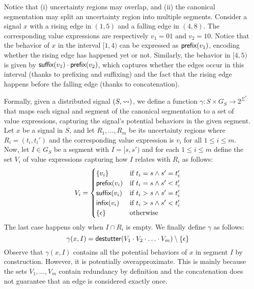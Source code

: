 Notice that (i) uncertainty regions may overlap, and (ii) the canonical segmentation may split an uncertainty region into multiple segments.
Consider a signal $x$ with a rising edge in $(1,5)$ and a falling edge in $(4,8)$.
The corresponding value expressions are respectively $v_1 = 01$ and $v_2 = 10$.
Notice that the behavior of $x$ in the interval $[1,4)$ can be expressed as $\textsf{prefix}(v_1)$, encoding whether the rising edge has happened yet or not.
Similarly, the behavior in $[4,5)$ is given by $\textsf{suffix}(v_1) \cdot \textsf{prefix}(v_2)$, which captures whether the edges occur in this interval (thanks to prefixing and suffixing) and the fact that the rising edge happens before the falling edge (thanks to concatenation).



Formally, given a distributed signal $(S,{\rightsquigarrow})$, we define a function $\gamma : S \times G_S \to 2^{\Sigma^*}$ that maps each signal and segment of the canonical segmentation to a set of value expressions, capturing the signal's potential behaviors in the given segment.
Let $x$ be a signal in $S$, and let $R_1, \ldots, R_m$ be its uncertainty regions where $R_i = (t_i, t_i')$ and the corresponding value expression is $v_i$ for all $1 \leq i \leq m$.
Now, let $I \in G_S$ be a segment with $I = [s, s')$ and for each $1 \leq i \leq m$ define the set $V_i$ of value expressions capturing how $I$ relates with $R_i$ as follows:
%
\small
\begin{equation} \label{eq:valexprset}
	V_i = 
	\begin{cases}
		\{v_i\} & \text{if } t_i = s \land s' = t_i' \\
		\textsf{prefix}(v_i) & \text{if } t_i = s \land s' < t_i' \\
		\textsf{suffix}(v_i) & \text{if } t_i > s \land s' = t_i' \\
		\textsf{infix}(v_i) & \text{if } t_i > s \land s' < t_i' \\
		\{\epsilon\} & \text{otherwise}
	\end{cases}
\end{equation}
\normalsize
The last case happens only when $I \cap R_i$ is 
empty.
We finally define $\gamma$ as follows:
\[ \gamma(x,I) = \mathsf{destutter}(V_1 \cdot V_2 \cdot \ldots \cdot V_m) \setminus \{\epsilon\} \]
Observe that $\gamma(x,I)$ contains all the potential behaviors of $x$ in segment $I$ by construction.
However, it is potentially overapproximate.
This is mainly because the sets $V_1, \ldots, V_m$ contain redundancy by definition and the concatenation does not guarantee that an edge is considered exactly once.

